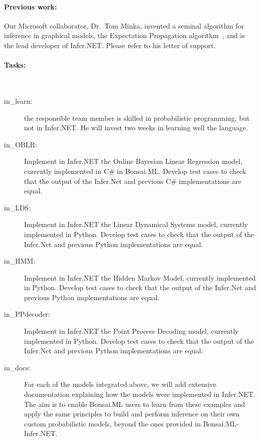 \paragraph{Previous work:} Our Microsoft collaborator, Dr.~Tom Minka, invented
a seminal algorithm for inference in graphical models, the Expectation
Propagation algorithm~\citep{minka01}, and is the lead developer of Infer.NET.
Please refer to his letter of support.

\paragraph{Tasks:}\mbox{}\\

\begin{description}

    \item[in\_learn:] the responsible team member is skilled in probabilistic
        programming, but not in Infer.NET. He will invest two weeks in learning
        well the language.

    \item[in\_OBLR:]  Implement in Infer.NET the Online Bayesian Linear
        Regression model, currently implemented in C\# in Bonsai.ML. Develop
        test cases to check that the output of the Infer.Net and previous C\#
        implementations are equal.

    \item[in\_LDS:] Implement in Infer.NET the Linear Dynamical Systems model,
        currently implemented in Python. Develop test cases to check that the
        output of the Infer.Net and previous Python implementations are equal.

    \item[in\_HMM:] Implement in Infer.NET the Hidden Markov Model, currently
        implemented in Python. Develop test cases to check that the output of
        the Infer.Net and previous Python implementations are equal.

    \item[in\_PPdecoder:] Implement in Infer.NET the Point Process Decoding
        model, currently implemented in Python. Develop test cases to check
        that the output of the Infer.Net and previous Python implementations
        are equal.

    \item[in\_docs:] For each of the models integrated above, we will add
        extensive documentation explaining how the models were implemented in
        Infer.NET. The aim is to enable Bonsai.ML users to learn from these
        examples and apply the same principles to build and perform inference
        on their own custom probabilistic models, beyond the ones provided in
        Bonsai.ML-Infer.NET.

\end{description}

